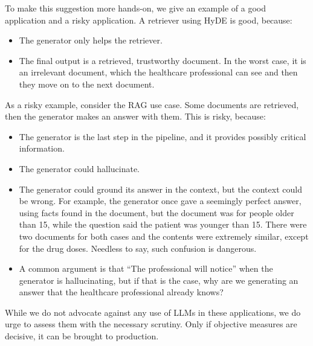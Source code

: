 To make this suggestion more hands-on, we give an example of a good application and a risky application. A retriever using HyDE is good, because:
\begin{itemize}
    \item The generator only helps the retriever.
    \item The final output is a retrieved, trustworthy document. In the worst case, it is an irrelevant document, which the healthcare professional can see and then they move on to the next document.
\end{itemize}
As a risky example, consider the RAG use case. Some documents are retrieved, then the generator makes an answer with them. This is risky, because:
\begin{itemize}
    \item The generator is the last step in the pipeline, and it provides possibly critical information.
    \item The generator could hallucinate.
    \item The generator could ground its answer in the context, but the context could be wrong. For example, the generator once gave a seemingly perfect answer, using facts found in the document, but the document was for people older than 15, while the question said the patient was younger than 15. There were two documents for both cases and the contents were extremely similar, except for the drug doses. Needless to say, such confusion is dangerous.
    \item A common argument is that ``The professional will notice'' when the generator is hallucinating, but if that is the case, why are we generating an answer that the healthcare professional already knows?
\end{itemize}

While we do not advocate against any use of LLMs in these applications, we do urge to assess them with the necessary scrutiny. Only if objective measures are decisive, it can be brought to production.

